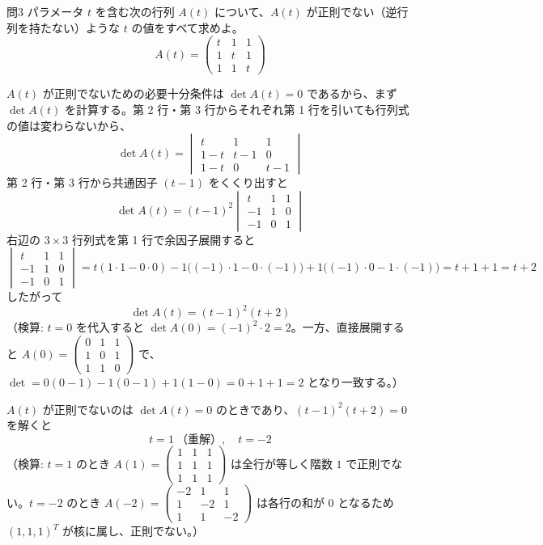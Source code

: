 \documentclass[a4paper,11pt]{article}
\begin{document}
\clearpage
\begin{mondaiboxS}{問3}
パラメータ $t$ を含む次の行列 $A(t)$ について、$A(t)$ が正則でない（逆行列を持たない）ような $t$ の値をすべて求めよ。
\[
A(t) =
\begin{pmatrix}
t & 1 & 1 \\
1 & t & 1 \\
1 & 1 & t
\end{pmatrix}
\]
\end{mondaiboxS}
\kaitou
$A(t)$ が正則でないための必要十分条件は $\det A(t) = 0$ であるから、まず $\det A(t)$ を計算する。第 2 行・第 3 行からそれぞれ第 1 行を引いても行列式の値は変わらないから、
\[
\det A(t) =
\begin{vmatrix}
t & 1 & 1 \\
1-t & t-1 & 0 \\
1-t & 0 & t-1
\end{vmatrix}
\]
第 2 行・第 3 行から共通因子 $(t-1)$ をくくり出すと
\[
\det A(t) = (t-1)^{2}
\begin{vmatrix}
t & 1 & 1 \\
-1 & 1 & 0 \\
-1 & 0 & 1
\end{vmatrix}
\]
右辺の $3\times3$ 行列式を第 1 行で余因子展開すると
\[
\begin{vmatrix}
t & 1 & 1 \\
-1 & 1 & 0 \\
-1 & 0 & 1
\end{vmatrix}
= t(1\cdot1 - 0\cdot0) - 1\bigl((-1)\cdot1 - 0\cdot(-1)\bigr) + 1\bigl((-1)\cdot0 - 1\cdot(-1)\bigr)
= t + 1 + 1 = t+2
\]
したがって
\[
\det A(t) = (t-1)^{2}(t+2)
\]
（検算: $t=0$ を代入すると $\det A(0) = (-1)^2\cdot 2 = 2$。一方、直接展開すると $A(0)=\begin{pmatrix}0&1&1\\1&0&1\\1&1&0\end{pmatrix}$ で、$\det = 0(0-1)-1(0-1)+1(1-0)=0+1+1=2$ となり一致する。）

$A(t)$ が正則でないのは $\det A(t) = 0$ のときであり、$(t-1)^{2}(t+2)=0$ を解くと
\[
\boxed{\; t = 1 \ \text{（重解）}, \quad t = -2 \;}
\]
（検算: $t=1$ のとき $A(1)=\begin{pmatrix}1&1&1\\1&1&1\\1&1&1\end{pmatrix}$ は全行が等しく階数 $1$ で正則でない。$t=-2$ のとき $A(-2)=\begin{pmatrix}-2&1&1\\1&-2&1\\1&1&-2\end{pmatrix}$ は各行の和が $0$ となるため $(1,1,1)^{T}$ が核に属し、正則でない。）
\end{document}
